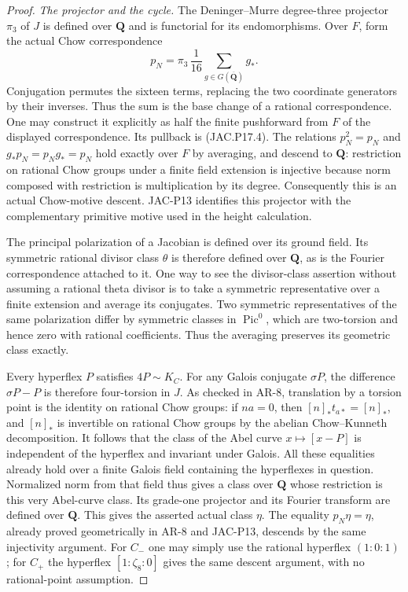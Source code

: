 \documentclass[11pt,a4paper]{article}
\begin{document}
\begin{proof}
\emph{The projector and the cycle.}
The Deninger--Murre degree-three projector $\pi_3$ of $J$ is
defined over $\mathbf Q$ and is functorial for its endomorphisms.
Over $F$, form the actual Chow correspondence
\[
          p_N=\pi_3\,\frac1{16}\sum_{g\in G(\overline{\mathbf Q})}g_*.
                                                               \tag{JAC.P17.4}
\]
Conjugation permutes the sixteen terms, replacing the two
coordinate generators by their inverses. Thus the sum is the
base change of a rational correspondence. One may construct
it explicitly as half the finite pushforward from $F$ of the
displayed correspondence. Its pullback is (JAC.P17.4).
The relations $p_N^2=p_N$ and $g_*p_N=p_Ng_*=p_N$ hold
exactly over $F$ by averaging, and descend to $\mathbf Q$:
restriction on rational Chow groups under a finite field
extension is injective because norm composed with restriction
is multiplication by its degree. Consequently this is an actual
Chow-motive descent. JAC-P13 identifies this projector with the
complementary primitive motive used in the height calculation.

The principal polarization of a Jacobian is defined over its
ground field. Its symmetric rational divisor class $\theta$ is
therefore defined over $\mathbf Q$, as is the Fourier
correspondence attached to it. One way to see the divisor-class
assertion without assuming a rational theta divisor is to take
a symmetric representative over a finite extension and average
its conjugates. Two symmetric representatives of the same
polarization differ by symmetric classes in $\operatorname{Pic}^0$,
which are two-torsion and hence zero with rational coefficients.
Thus the averaging preserves its geometric class exactly.

Every hyperflex $P$ satisfies $4P\sim K_C$. For any Galois
conjugate $\sigma P$, the difference $\sigma P-P$ is therefore
four-torsion in $J$. As checked in AR-8, translation by a torsion
point is the identity on rational Chow groups: if $na=0$, then
$[n]_*t_{a*}=[n]_*$, and $[n]_*$ is invertible on rational Chow
groups by the abelian Chow--Kunneth decomposition.
It follows that the class of the Abel curve
$x\mapsto[x-P]$ is independent of the hyperflex and invariant
under Galois. All these equalities already hold over a finite
Galois field containing the hyperflexes in question.
Normalized norm from that field thus gives a class over
$\mathbf Q$ whose restriction is this very Abel-curve class.
Its grade-one projector and its Fourier transform are defined
over $\mathbf Q$. This gives the asserted actual class $\eta$.
The equality $p_N\eta=\eta$, already proved geometrically in
AR-8 and JAC-P13, descends by the same injectivity argument.
For $C_-$ one may simply use the rational hyperflex $(1:0:1)$;
for $C_+$ the hyperflex $[1:\zeta_8:0]$ gives the same
descent argument, with no rational-point assumption.


\end{proof}
\end{document}
